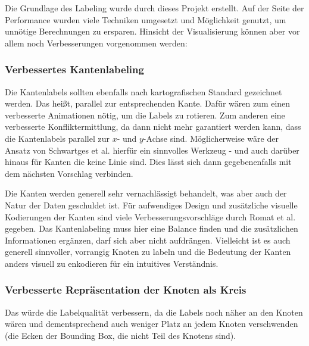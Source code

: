 %
%

Die Grundlage des Labeling wurde durch dieses Projekt erstellt. Auf der Seite der Performance wurden viele Techniken umgesetzt
und Möglichkeit genutzt, um unnötige Berechnungen zu ersparen. Hinsicht der Visualisierung können aber vor allem noch Verbesserungen vorgenommen werden:

\subsubsection{Verbessertes Kantenlabeling}
Die Kantenlabels sollten ebenfalls nach kartografischen Standard gezeichnet werden.\cite{cartography} Das heißt, parallel zur entsprechenden Kante.
Dafür wären zum einen verbesserte Animationen nötig, um die Labels zu rotieren. Zum anderen eine verbesserte Konfliktermittlung,
da dann nicht mehr garantiert werden kann, dass die Kantenlabels parallel zur $x$- und $y$-Achse sind. Möglicherweise wäre der Ansatz von Schwartges et al.\cite{edge_labels} hierfür ein sinnvolles Werkzeug - und auch darüber hinaus für Kanten die keine Linie sind. Dies lässt sich dann gegebenenfalls mit dem nächsten Vorschlag verbinden.

Die Kanten werden generell sehr vernachlässigt behandelt, was aber auch der Natur der Daten geschuldet ist.
Für aufwendiges Design und zusätzliche visuelle Kodierungen der Kanten sind viele Verbesserungsvorschläge durch Romat et al.\cite{edge_improve} gegeben.
Das Kantenlabeling muss hier eine Balance finden und die zusätzlichen Informationen ergänzen, darf sich aber nicht aufdrängen.
Vielleicht ist es auch generell sinnvoller, vorrangig Knoten zu labeln und die Bedeutung der Kanten anders visuell zu enkodieren für ein intuitives Verständnis.

\subsubsection{Verbesserte Repräsentation der Knoten als Kreis}
Das würde die Labelqualität verbessern, da die Labels noch näher an den Knoten wären und dementsprechend auch weniger Platz an jedem Knoten verschwenden (die Ecken der Bounding Box, die nicht Teil des Knotens sind).

